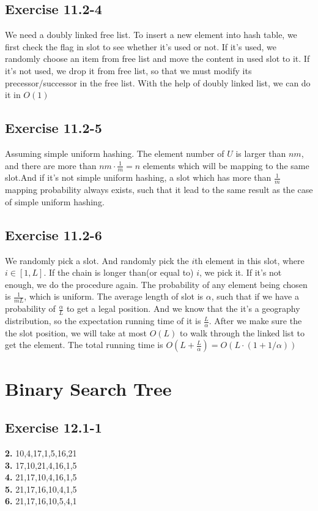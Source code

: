 \documentclass[12pt]{article}
\theoremstyle{definition}
\theoremstyle{remark}
\begin{document}
\subsection*{Exercise 11.2-4}
We need a doubly linked free list. To insert a new element into hash table, we first check the flag in slot to see whether it's used or not. If it's used, we randomly choose an item from free list and move the content in used slot to it. If it's not used, we drop it from free list, so that we must modify its precessor/successor in the free list. With the help of doubly linked list, we can do it in $O(1)$
\subsection*{Exercise 11.2-5}
Assuming simple uniform hashing. The element number of $U$ is larger than $nm$, and there are more than $nm\cdot\frac{1}{m}=n$ elements which will be mapping to the same slot.And if it's not simple uniform hashing, a slot which has more than $\frac{1}{m}$ mapping probability always exists, such that it lead to the same result as the case of simple uniform hashing.
\subsection*{Exercise 11.2-6}
We randomly pick a slot. And randomly pick the $i$th element in this slot, where $i\in[1,L]$. If the chain is longer than(or equal to) $i$, we pick it. If it's not enough, we do the procedure again. The probability of any element being chosen is $\frac{1}{mL}$, which is uniform. The average length of slot is $\alpha$, such that if we have a probability of $\frac{\alpha}{L}$ to get a legal position. And we know that the it's a geography distribution, so the expectation running time of it is $\frac{L}{\alpha}$. After we make sure the the slot position, we will take at most $O(L)$ to walk through the linked list to get the element. The total running time is $O(L+\frac{L}{\alpha})=O(L\cdot(1+1/\alpha))$
\section{Binary Search Tree}
\subsection*{Exercise 12.1-1}
\textbf{2.} 10,4,17,1,5,16,21\\
\textbf{3.} 17,10,21,4,16,1,5\\
\textbf{4.} 21,17,10,4,16,1,5\\
\textbf{5.} 21,17,16,10,4,1,5\\
\textbf{6.} 21,17,16,10,5,4,1
\end{document}
